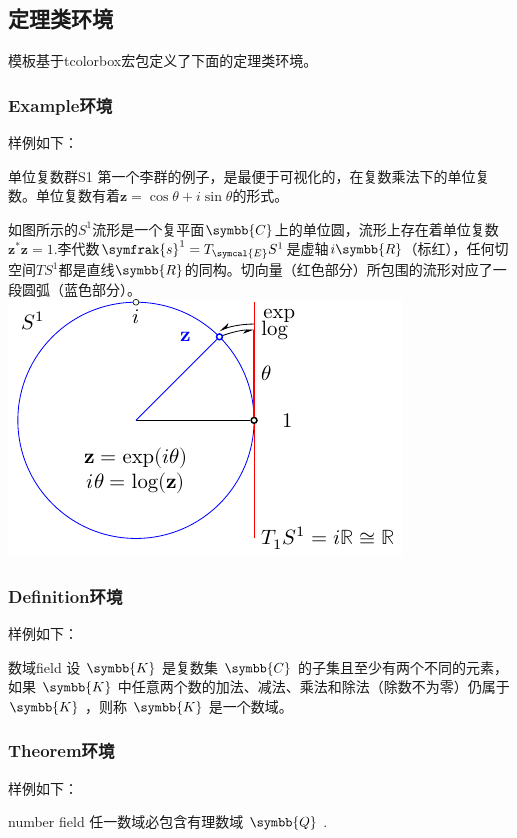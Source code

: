 \documentclass{gunote}
\begin{document}
\subsection{定理类环境}
模板基于\textsf{tcolorbox}宏包定义了下面的定理类环境。
\subsubsection{Example环境}
样例如下：
\begin{Example}[halign lower=flush center, sidebyside]{单位复数群}{S1}
  第一个李群的例子，是最便于可视化的，在复数乘法下的单位复数。单位复数有着$\symbf{z}=\cos\theta+i\sin\theta$的形式。

  如图所示的$S^1$流形是一个复平面$\symbb{C}$上的单位圆，流形上存在着单位复数$\symbf{z}^*\symbf{z}=1$.李代数$\symfrak{s}^1=T_{\symcal{E}}S^1$是虚轴$i\symbb{R}$（标红），任何切空间$TS^1$都是直线$\symbb{R}$的同构。切向量（红色部分）所包围的流形对应了一段圆弧（蓝色部分）。
  \tcblower
  \includegraphics{picture/manifold.pdf}
\end{Example}
\subsubsection{Definition环境}
样例如下：
\begin{Definition}{数域}{field}
  设 $\symbb{K}$ 是复数集 $\symbb{C}$ 的子集且至少有两个不同的元素，如果 $\symbb{K}$ 中任意两个数的加法、减法、乘法和除法（除数不为零）仍属于 $\symbb{K}$ ，则称 $\symbb{K}$ 是一个数域。
\end{Definition}
\subsubsection{Theorem环境}
样例如下：
\begin{Theorem}{}{number field}
  任一数域必包含有理数域 $\symbb{Q}$ .
\end{Theorem}
\end{document}
